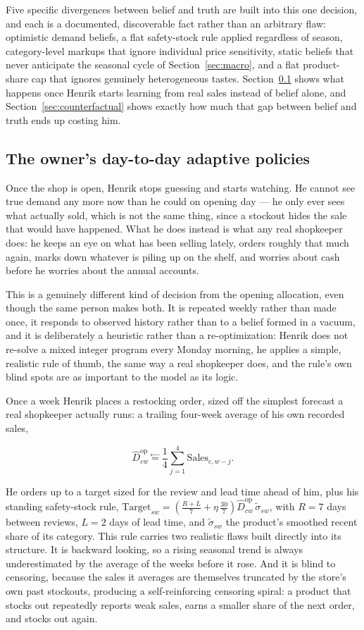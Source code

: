\documentclass[12pt,a4paper]{article}
\begin{document}
Five specific divergences between belief and truth are built into this
one decision, and each is a documented, discoverable fact rather than an
arbitrary flaw: optimistic demand beliefs, a flat safety-stock rule
applied regardless of season, category-level markups that ignore
individual price sensitivity, static beliefs that never anticipate the
seasonal cycle of Section~\ref{sec:macro}, and a flat product-share cap
that ignores genuinely heterogeneous tastes. Section~\ref{sec:micro-adaptive}
shows what happens once Henrik starts learning from real sales instead
of belief alone, and Section~\ref{sec:counterfactual} shows exactly how
much that gap between belief and truth ends up costing him.

\subsection{The owner's day-to-day adaptive policies}
\label{sec:micro-adaptive}

Once the shop is open, Henrik stops guessing and starts watching. He
cannot see true demand any more now than he could on opening day --- he
only ever sees what actually sold, which is not the same thing, since a
stockout hides the sale that would have happened. What he does instead
is what any real shopkeeper does: he keeps an eye on what has been
selling lately, orders roughly that much again, marks down whatever is
piling up on the shelf, and worries about cash before he worries about
the annual accounts.

This is a genuinely different kind of decision from the opening
allocation, even though the same person makes both. It is repeated
weekly rather than made once, it responds to observed history rather than
to a belief formed in a vacuum, and it is deliberately a heuristic rather
than a re-optimization: Henrik does not re-solve a mixed integer program
every Monday morning, he applies a simple, realistic rule of thumb, the
same way a real shopkeeper does, and the rule's own blind spots are as
important to the model as its logic.

Once a week Henrik places a restocking order, sized off the simplest
forecast a real shopkeeper actually runs: a trailing four-week average
of his own recorded sales,

\[
\hat{D}^{\text{op}}_{cw} \overset{\leftarrow}{=} \frac{1}{4}\sum_{j=1}^{4}
\text{Sales}_{c,w-j} .
\]

He orders up to a target sized for the review and
lead time ahead of him, plus his standing safety-stock rule,
$\text{Target}_{sw} = \left(\tfrac{R+L}{7} + \eta\,\tfrac{30}{7}\right)
\hat{D}^{\text{op}}_{cw}\,\tilde{\sigma}_{sw}$, with $R=7$ days between
reviews, $L=2$ days of lead time, and $\tilde{\sigma}_{sw}$ the
product's smoothed recent share of its category. This rule carries two
realistic flaws built directly into its structure. It is backward
looking, so a rising seasonal trend is always underestimated by the
average of the weeks before it rose. And it is blind to censoring,
because the sales it averages are themselves truncated by the store's
own past stockouts, producing a self-reinforcing censoring spiral: a
product that stocks out repeatedly reports weak sales, earns a smaller
share of the next order, and stocks out again.
\end{document}
